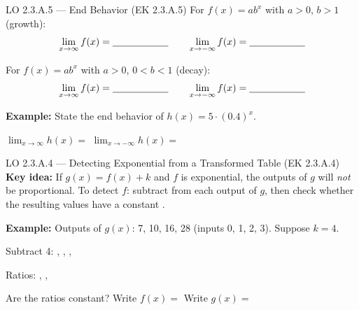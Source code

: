 \documentclass[10pt]{article}
\begin{document}
\vspace{0.04in}

\begin{notesbox}{LO 2.3.A.5 --- End Behavior (EK 2.3.A.5)}
For $f(x) = ab^x$ with $a > 0$, $b > 1$ (growth):
\[
  \lim_{x \to \infty} f(x) = \blank{2cm}
  \qquad
  \lim_{x \to -\infty} f(x) = \blank{2cm}
\]

For $f(x) = ab^x$ with $a > 0$, $0 < b < 1$ (decay):
\[
  \lim_{x \to \infty} f(x) = \blank{2cm}
  \qquad
  \lim_{x \to -\infty} f(x) = \blank{2cm}
\]

\textbf{Example:} State the end behavior of $h(x) = 5 \cdot (0.4)^x$.

\vspace{0.04in}
$\displaystyle\lim_{x\to\infty} h(x) = $ \blank{2cm} \qquad
$\displaystyle\lim_{x\to-\infty} h(x) = $ \blank{2cm}
\end{notesbox}

\vspace{0.04in}

\begin{notesbox}{LO 2.3.A.4 --- Detecting Exponential from a Transformed Table (EK 2.3.A.4)}
\textbf{Key idea:} If $g(x) = f(x) + k$ and $f$ is exponential, the outputs of $g$ will
\textit{not} be proportional. To detect $f$: subtract \blank{1.5cm} from each output of $g$,
then check whether the resulting values have a constant \blank{2cm}.

\medskip
\textbf{Example:} Outputs of $g(x)$: 7, 10, 16, 28 (inputs 0, 1, 2, 3). Suppose $k = 4$.

\vspace{0.04in}
Subtract 4: \blank{1.2cm}, \blank{1.2cm}, \blank{1.2cm}, \blank{1.2cm}

Ratios: \blank{1.5cm}, \blank{1.5cm}, \blank{1.5cm}

Are the ratios constant? \blank{2cm} \quad Write $f(x) = $ \blank{3cm}
\quad Write $g(x) = $ \blank{4cm}
\end{notesbox}
\end{document}
